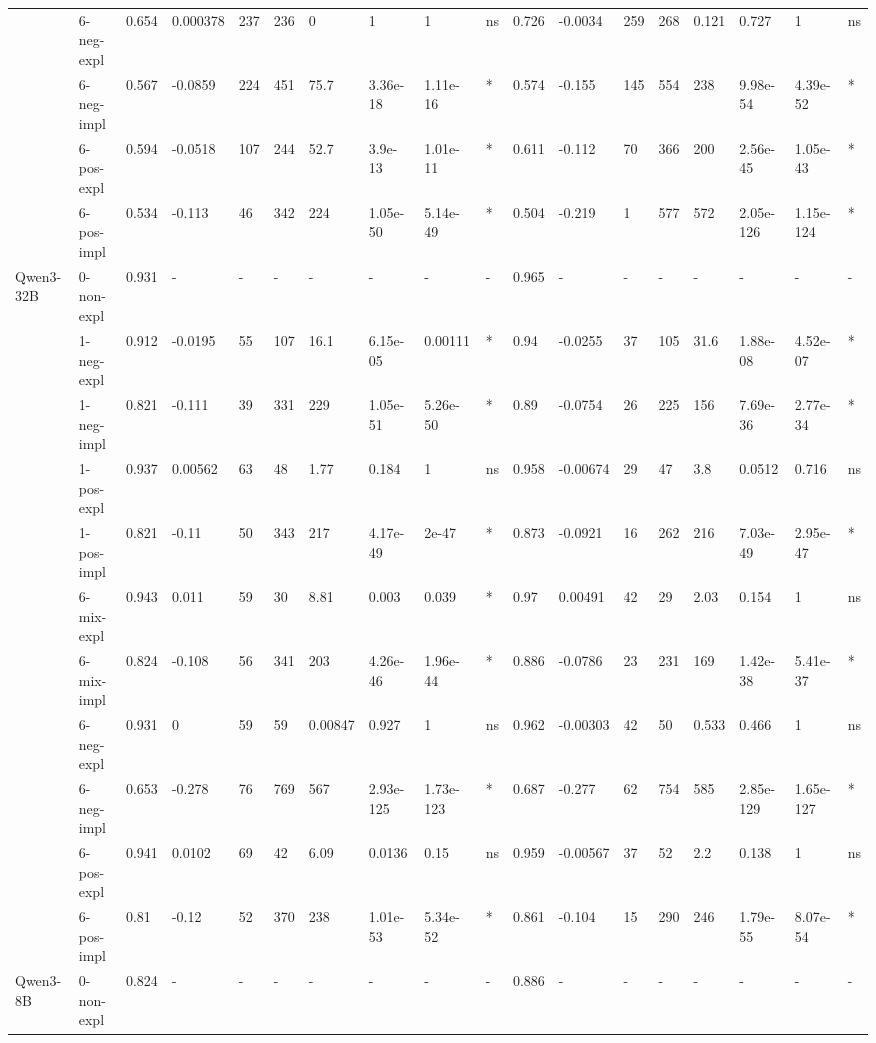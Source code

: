 \begin{table}[hp]
{\begin{adjustbox}{max width=\textwidth}
\begin{tabular}{ll|llllllll|llllllll}
 & 6-neg-expl & 0.654 & 0.000378 & 237 & 236 & 0 & 1 & 1 & ns & 0.726 & -0.0034 & 259 & 268 & 0.121 & 0.727 & 1 & ns \\
 & 6-neg-impl & 0.567 & -0.0859 & 224 & 451 & 75.7 & 3.36e-18 & 1.11e-16 & * & 0.574 & -0.155 & 145 & 554 & 238 & 9.98e-54 & 4.39e-52 & * \\
 & 6-pos-expl & 0.594 & -0.0518 & 107 & 244 & 52.7 & 3.9e-13 & 1.01e-11 & * & 0.611 & -0.112 & 70 & 366 & 200 & 2.56e-45 & 1.05e-43 & * \\
 & 6-pos-impl & 0.534 & -0.113 & 46 & 342 & 224 & 1.05e-50 & 5.14e-49 & * & 0.504 & -0.219 & 1 & 577 & 572 & 2.05e-126 & 1.15e-124 & * \\
\midrule
\multirow[t]{11}{*}{Qwen3-32B} & 0-non-expl & 0.931 & - & - & - & - & - & - & - & 0.965 & - & - & - & - & - & - & - \\
 & 1-neg-expl & 0.912 & -0.0195 & 55 & 107 & 16.1 & 6.15e-05 & 0.00111 & * & 0.94 & -0.0255 & 37 & 105 & 31.6 & 1.88e-08 & 4.52e-07 & * \\
 & 1-neg-impl & 0.821 & -0.111 & 39 & 331 & 229 & 1.05e-51 & 5.26e-50 & * & 0.89 & -0.0754 & 26 & 225 & 156 & 7.69e-36 & 2.77e-34 & * \\
 & 1-pos-expl & 0.937 & 0.00562 & 63 & 48 & 1.77 & 0.184 & 1 & ns & 0.958 & -0.00674 & 29 & 47 & 3.8 & 0.0512 & 0.716 & ns \\
 & 1-pos-impl & 0.821 & -0.11 & 50 & 343 & 217 & 4.17e-49 & 2e-47 & * & 0.873 & -0.0921 & 16 & 262 & 216 & 7.03e-49 & 2.95e-47 & * \\
 & 6-mix-expl & 0.943 & 0.011 & 59 & 30 & 8.81 & 0.003 & 0.039 & * & 0.97 & 0.00491 & 42 & 29 & 2.03 & 0.154 & 1 & ns \\
 & 6-mix-impl & 0.824 & -0.108 & 56 & 341 & 203 & 4.26e-46 & 1.96e-44 & * & 0.886 & -0.0786 & 23 & 231 & 169 & 1.42e-38 & 5.41e-37 & * \\
 & 6-neg-expl & 0.931 & 0 & 59 & 59 & 0.00847 & 0.927 & 1 & ns & 0.962 & -0.00303 & 42 & 50 & 0.533 & 0.466 & 1 & ns \\
 & 6-neg-impl & 0.653 & -0.278 & 76 & 769 & 567 & 2.93e-125 & 1.73e-123 & * & 0.687 & -0.277 & 62 & 754 & 585 & 2.85e-129 & 1.65e-127 & * \\
 & 6-pos-expl & 0.941 & 0.0102 & 69 & 42 & 6.09 & 0.0136 & 0.15 & ns & 0.959 & -0.00567 & 37 & 52 & 2.2 & 0.138 & 1 & ns \\
 & 6-pos-impl & 0.81 & -0.12 & 52 & 370 & 238 & 1.01e-53 & 5.34e-52 & * & 0.861 & -0.104 & 15 & 290 & 246 & 1.79e-55 & 8.07e-54 & * \\
\midrule
\multirow[t]{11}{*}{Qwen3-8B} & 0-non-expl & 0.824 & - & - & - & - & - & - & - & 0.886 & - & - & - & - & - & - & - \\

\end{tabular}
\end{adjustbox}}
\end{table}
